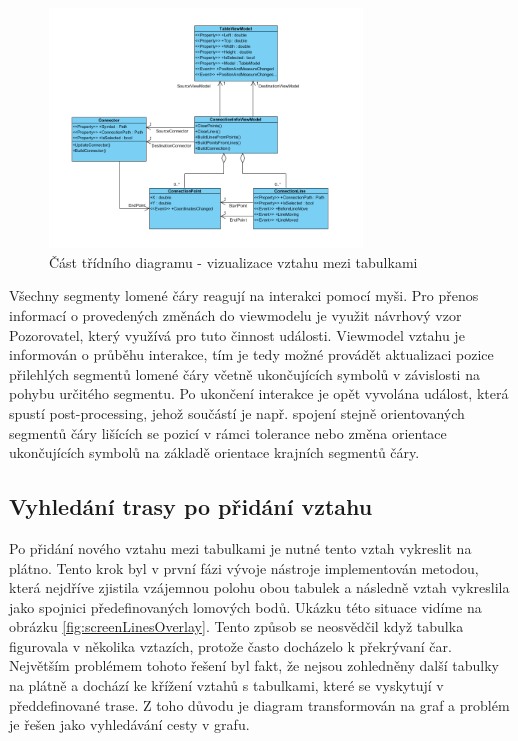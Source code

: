 \documentclass[czech,bachelor,public,dept460,male,oneside]{diploma}
\begin{document}
		\begin{figure}[!h]
			\centering
			\includegraphics[width=0.74\textwidth]{Figures/EditorVztahy}
			\caption{Část třídního diagramu - vizualizace vztahu mezi tabulkami}
			\label{fig:classDiagMovePolyline}
		\end{figure}
		
		Všechny segmenty lomené čáry reagují na interakci pomocí myši. Pro přenos informací o provedených změnách do viewmodelu je využit návrhový vzor Pozorovatel, který využívá pro tuto činnost události. Viewmodel vztahu je informován o průběhu interakce, tím je tedy možné provádět aktualizaci pozice přilehlých segmentů lomené čáry včetně ukončujících symbolů v závislosti na pohybu určitého segmentu. Po ukončení interakce je opět vyvolána událost, která spustí post-processing, jehož součástí je např. spojení stejně orientovaných segmentů čáry lišících se pozicí v rámci tolerance nebo změna orientace ukončujících symbolů na základě orientace krajních segmentů čáry.
		
	\subsection{Vyhledání trasy po přidání vztahu} \label{secAStar}
	Po přidání nového vztahu mezi tabulkami je nutné tento vztah vykreslit na plátno. Tento krok byl v první fázi vývoje nástroje implementován metodou, která nejdříve zjistila vzájemnou polohu obou tabulek a následně vztah vykreslila jako spojnici předefinovaných lomových bodů. Ukázku této situace vidíme na obrázku \ref{fig:screenLinesOverlay}. Tento způsob se neosvědčil když tabulka figurovala v několika vztazích, protože často docházelo k překrývaní čar. Největším problémem tohoto řešení byl fakt, že nejsou zohledněny další tabulky na plátně a dochází ke křížení vztahů s tabulkami, které se vyskytují v předdefinované trase. Z toho důvodu je diagram transformován na graf a problém je řešen jako vyhledávání cesty v grafu.
	
\end{document}
